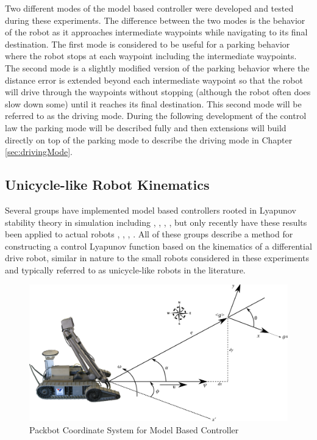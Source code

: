 Two different modes of the model based controller were developed and tested during these experiments. The difference between the two modes is the behavior of the robot as it approaches intermediate waypoints while navigating to its final destination. The first mode is considered to be useful for a parking behavior where the robot stops at each waypoint including the intermediate waypoints. The second mode is a slightly modified version of the parking behavior where the distance error is extended beyond each intermediate waypoint so that the robot will drive through the waypoints without stopping (although the robot often does slow down some) until it reaches its final destination. This second mode will be referred to as the driving mode. During the following development of the control law the parking mode will be described fully and then extensions will build directly on top of the parking mode to describe the driving mode in Chapter \ref{sec:drivingMode}.

\subsection{Unicycle-like Robot Kinematics}
\label{sec:unicycleKinematics}
Several groups have implemented model based controllers rooted in Lyapunov stability theory in simulation including \cite{MicaelliLyapunov93}, \cite{Aicardi94}, \cite{Aicardi_UnicycleLyapunov95}, \cite{Rusu05RobotuxLyapunov}, \cite{Gulati08} but only recently have these results been applied to actual robots \cite{KimLyapunov05}, \cite{Lapierre06}, \cite{Lapierre07}, \cite{NuchterLyapunov07}. All of these groups describe a method for constructing a control Lyapunov function based on the kinematics of a differential drive robot, similar in nature to the small robots considered in these experiments and typically referred to as unicycle-like robots in the literature.

\begin{figure}[ht!]
	\centering
	\includegraphics[width=.95\textwidth]{images/packbotlyapunov}
	\caption{Packbot Coordinate System for Model Based Controller}
	\label{fig:pblyapunov}
\end{figure}

